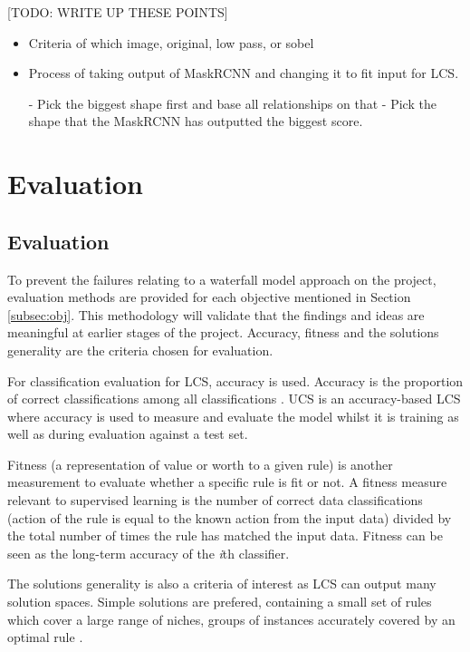 [TODO: WRITE UP THESE POINTS]
\begin{itemize}


	 \item Criteria of which image, original, low pass, or sobel
	 \item Process of taking output of MaskRCNN and changing it to fit input for LCS. 
	 
	 - Pick the biggest shape first and base all relationships on that
	 - Pick the shape that the MaskRCNN has outputted the biggest score.


\end{itemize}

\chapter{Evaluation}
\section{Evaluation} \label{sec:eval}
To prevent the failures relating to a waterfall model approach on the project, evaluation methods are provided for each objective mentioned in Section \ref{subsec:obj}. This methodology will validate that the findings and ideas are  meaningful at earlier stages of the project. Accuracy, fitness and the solution\textquotesingle s generality are the criteria chosen for evaluation.

For classification evaluation for LCS, accuracy is used. Accuracy is the proportion of correct classifications among all classifications \cite{urbanowicz2017introduction}. UCS is an accuracy-based LCS where accuracy is used to measure and evaluate the model whilst it is training as well as during evaluation against a test set.

Fitness (a representation of value or worth to a given rule)\cite{urbanowicz2017introduction} is another measurement to evaluate whether a specific rule is fit or not. A fitness measure relevant to supervised learning is the number of correct data classifications (action of the rule is equal to the known action from the input data) divided by the total number of times the rule has matched the input data. Fitness can be seen as the long-term accuracy of the \textit{i}th classifier.

The solution\textquotesingle s generality is also a criteria of interest as LCS can output many solution spaces. Simple solutions are prefered, containing a small set of rules which cover a large range of niches, groups of instances accurately covered by an optimal rule \cite{urbanowicz2017introduction}. 

